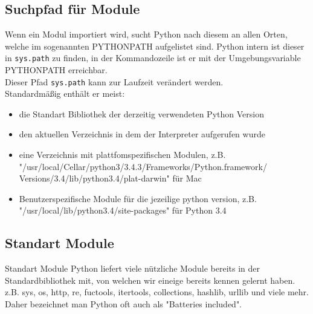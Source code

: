\begin{frame}
	
	
\end{frame}

\subsection{Suchpfad für Module}
\begin{frame}
	Wenn ein Modul importiert wird, sucht Python nach diesem an allen Orten, welche im sogenannten PYTHONPATH aufgelistet sind. Python intern ist dieser in \texttt{sys.path} zu finden, in der Kommandozeile ist er mit der Umgebungsvariable PYTHONPATH erreichbar.\\
	Dieser Pfad \texttt{sys.path} kann zur Laufzeit verändert werden.\\
	Standardmäßig enthält er meist:
	\begin{itemize}
		\item die Standart Bibliothek der derzeitig verwendeten Python Version
		\item den aktuellen Verzeichnis in dem der Interpreter aufgerufen wurde
		\item eine Verzeichnis mit plattfomspezifischen Modulen, z.B.
			"/usr/local/Cellar/python3/3.4.3/Frameworks/Python.framework/
			Versions/3.4/lib/python3.4/plat-darwin" für Mac
		\item Benutzerspezifische Module für die jezeilige python version, z.B. "/usr/local/lib/python3.4/site-packages" für Python 3.4
	\end{itemize}
\end{frame}

\subsection{Standart Module}
\begin{frame}{Standart Module}
	Python liefert viele nützliche Module bereits in der Standardbibliothek mit, von welchen wir eineige bereits kennen gelernt haben.
	z.B. sys, os, http, re, fuctools, itertools, collections, hashlib, urllib und viele mehr. Daher bezeichnet man Python oft auch als "Batteries included".
\end{frame}

